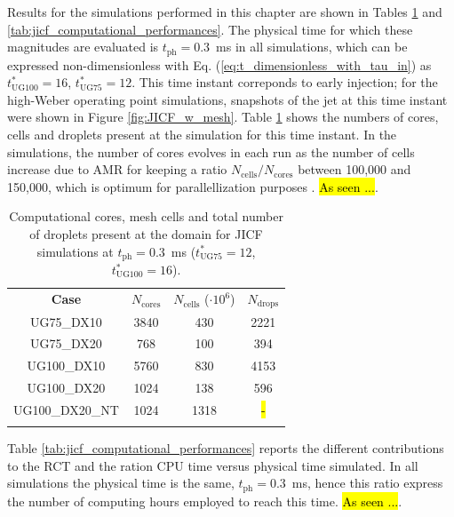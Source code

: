 Results for the simulations performed in this chapter are shown in Tables \ref{tab:jicf_Ncores_Ncells_Ndrops} and \ref{tab:jicf_computational_performances}. The physical time for which these magnitudes are evaluated is $t_\mathrm{ph} = 0.3$~ms in all simulations, which can be expressed non-dimensionless with Eq. (\ref{eq:t_dimensionless_with_tau_in}) as $t^*_{\mathrm{UG}100} = 16$, $t^*_{\mathrm{UG}75} = 12$. This time instant correponds to early injection; for the high-Weber operating point simulations, snapshots of the jet at this time instant were shown in Figure \ref{fig:JICF_w_mesh}. Table \ref{tab:jicf_Ncores_Ncells_Ndrops} shows the numbers of cores, cells and droplets present at the simulation for this time instant. In the simulations, the number of cores evolves in each run as the number of cells increase due to AMR for keeping a ratio $N_\mathrm{cells} / N_\mathrm{cores}$ between 100,000 and 150,000, which is optimum for parallellization purposes . \hl{As seen ...}. 



\begin{table}[!h]
\centering
\caption{Computational cores, mesh cells and total number of droplets present at the domain for JICF simulations at $t_\mathrm{ph} = 0.3$~ms ($t^*_{\mathrm{UG}75} = 12$, $t^*_{\mathrm{UG}100} = 16$).}
\begin{tabular}{cccc}
\thickhline
\textbf{Case} &  $N_\mathrm{cores}$ & $N_\mathrm{cells}$ ($\cdot 10^6$) & $N_\mathrm{drops}$\\
\thickhline 
UG75\_DX10 & 3840 & 430 & 2221 \\
UG75\_DX20 & 768 & 100 & 394 \\
UG100\_DX10 & 5760 & 830 & 4153 \\
UG100\_DX20 & 1024 & 138 & 596\\
UG100\_DX20\_NT & 1024 & 1318 & \hl{-} \\
\thickhline
\end{tabular}
\label{tab:jicf_Ncores_Ncells_Ndrops}
\end{table}


Table \ref{tab:jicf_computational_performances} reports the different contributions to the RCT and the ration CPU time versus physical time simulated. In all simulations the physical time is the same, $t_\mathrm{ph} = 0.3$~ms, hence this ratio express the number of computing hours employed to reach this time. \hl{As seen ...}.

